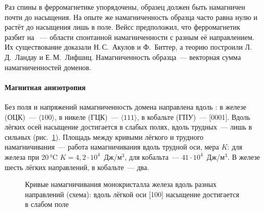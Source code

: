 Раз спины в ферромагнетике упорядочены, образец должен быть намагничен
почти до насыщения. На опыте же намагниченность образца часто равна
нулю и растёт до насыщения лишь в поле. Вейсс предположил, что
ферромагнетик разбит на ~— области спонтанной
намагниченности с разным её направлением. Их существование доказали
Н.\,С.~Акулов и Ф.~Биттер, а теорию построили Л.\,Д.~Ландау и
Е.\,М.~Лифшиц. Намагниченность образца~— векторная сумма намагниченностей
доменов.

\paragraph{Магнитная анизотропия}
Без поля и напряжений намагниченность домена направлена вдоль
: в железе (ОЦК)~— $\langle100\rangle$,
в никеле (ГЦК)~— $\langle111\rangle$, в кобальте (ГПУ)~— [0001]. Вдоль лёгких
осей насыщение достигается в слабых полях, вдоль трудных~— лишь в
сильных (рис.~\ref{fig:anisotropy}). Площадь между кривыми лёгкого и
трудного намагничивания~— работа намагничивания вдоль трудной оси,
мера  $K$: для железа при 20\,°C
$K=4{,}2\cdot10^4$~Дж/м$^3$, для кобальта~— $41\cdot10^4$~Дж/м$^3$. В железе
шесть лёгких направлений, в кобальте~— два.

\begin{figure}[ht]
\centering
{}
\caption{Кривые намагничивания монокристалла железа вдоль разных
направлений (схема): вдоль лёгкой оси [100] насыщение достигается в
слабом поле}
\label{fig:anisotropy}
\end{figure}

